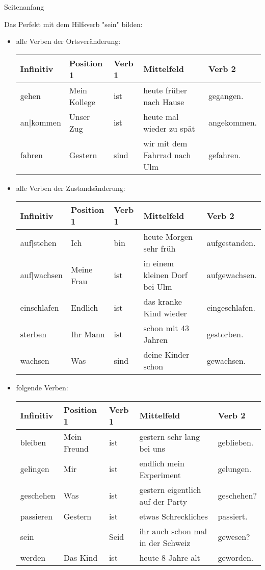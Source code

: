 Seitenanfang

Das Perfekt mit dem Hilfsverb "sein" bilden:
\begin{itemize}
\item alle Verben der Ortsver\"anderung: \\
\begin{tabular}{|l|l|l|l|l|}
\hline
Infinitiv & Position 1 & Verb 1 & Mittelfeld & Verb 2 \\
\hline
gehen & Mein Kollege & ist & heute fr\"uher nach Hause & gegangen. \\
an|kommen & Unser Zug & ist & heute mal wieder zu sp\"at & angekommen. \\
fahren & Gestern & sind & wir mit dem Fahrrad nach Ulm & gefahren. \\
\hline
\end{tabular}
\item alle Verben der Zustands\"anderung: \\
\begin{tabular}{|l|l|l|l|l|}
\hline
Infinitiv & Position 1 & Verb 1 & Mittelfeld & Verb 2 \\
\hline
auf|stehen & Ich & bin & heute Morgen sehr fr\"uh & aufgestanden. \\
auf|wachsen & Meine Frau & ist & in einem kleinen Dorf bei Ulm & aufgewachsen. \\
einschlafen & Endlich & ist & das kranke Kind wieder & eingeschlafen. \\
sterben & Ihr Mann & ist & schon mit 43 Jahren & gestorben. \\
wachsen & Was & sind & deine Kinder schon & gewachsen. \\
\hline
\end{tabular}
\item folgende Verben: \\
\begin{tabular} {|l|l|l|l|l|}
\hline
Infinitiv & Position 1 & Verb 1 & Mittelfeld & Verb 2 \\
\hline
bleiben & Mein Freund & ist & gestern sehr lang bei uns & geblieben. \\
gelingen & Mir & ist & endlich mein Experiment & gelungen. \\
geschehen & Was & ist & gestern eigentlich auf der Party & geschehen? \\
passieren & Gestern & ist & etwas Schreckliches & passiert. \\
sein & ~ & Seid & ihr auch schon mal in der Schweiz & gewesen? \\
werden & Das Kind & ist & heute 8 Jahre alt & geworden. \\
\hline
\end{tabular}
\end{itemize}
